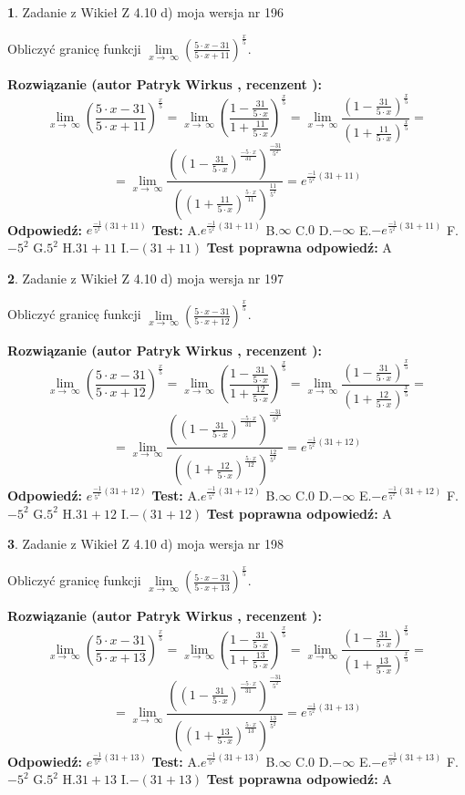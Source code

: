 \documentclass[12pt, a4paper]{article}
\theoremstyle{definition} %
\newtheorem{zad}{}
\newcommand{\zadStart}[1]{\begin{zad}#1\newline}
\newcommand{\zadStop}{\end{zad}}
\newcommand{\rozwStart}[2]{\noindent \textbf{Rozwiązanie (autor #1 , recenzent #2): }\newline}
\newcommand{\rozwStop}{\newline}
\newcommand{\odpStart}{\noindent \textbf{Odpowiedź:}\newline}
\newcommand{\odpStop}{\newline}
\newcommand{\testStart}{\noindent \textbf{Test:}\newline}
\newcommand{\testStop}{\newline}
\newcommand{\kluczStart}{\noindent \textbf{Test poprawna odpowiedź:}\newline}
\newcommand{\kluczStop}{\newline}
\begin{document}
\zadStart{Zadanie z Wikieł Z 4.10 d) moja wersja nr 196}


Obliczyć granicę funkcji  $\lim\limits_{x\to\ \infty}(\frac{5\cdot x-31}{5\cdot x+11})^{\frac{x}{5}}$.
\zadStop
\rozwStart{Patryk Wirkus}{}
$$\lim\limits_{x\to\ \infty}(\frac{5\cdot x-31}{5\cdot x+11})^{\frac{x}{5}} = \lim\limits_{x\to\ \infty}(\frac{1-\frac{31}{5\cdot x}}{1+\frac{11}{5\cdot x}})^{\frac{x}{5}}=\lim\limits_{x\to\ \infty}\frac{(1-\frac{31}{5\cdot x})^{\frac{x}{5}}}{(1+\frac{11}{5\cdot x})^{\frac{x}{5}}}=$$
$$=\lim\limits_{x\to\ \infty}\frac{((1-\frac{31}{5\cdot x})^{\frac{-5\cdot x}{31}})^{\frac{-31}{5^{2}}}}{((1+\frac{11}{5\cdot x})^{\frac{5\cdot x}{11}})^{\frac{11}{5^{2}}}}=e^{\frac{-1}{5^{2}}(31+11)}$$
\rozwStop
\odpStart
$e^{\frac{-1}{5^{2}}(31+11)}$
\odpStop
\testStart
A.$e^{\frac{-1}{5^{2}}(31+11)}$ B.$\infty$ C.$0$ D.$-\infty$ E.$-e^{\frac{-1}{5^{2}}(31+11)}$
F.$-5^{2}$ G.$5^{2}$
H.$31+11$
I.$-(31+11)$
\testStop
\kluczStart
A
\kluczStop



\zadStart{Zadanie z Wikieł Z 4.10 d) moja wersja nr 197}


Obliczyć granicę funkcji  $\lim\limits_{x\to\ \infty}(\frac{5\cdot x-31}{5\cdot x+12})^{\frac{x}{5}}$.
\zadStop
\rozwStart{Patryk Wirkus}{}
$$\lim\limits_{x\to\ \infty}(\frac{5\cdot x-31}{5\cdot x+12})^{\frac{x}{5}} = \lim\limits_{x\to\ \infty}(\frac{1-\frac{31}{5\cdot x}}{1+\frac{12}{5\cdot x}})^{\frac{x}{5}}=\lim\limits_{x\to\ \infty}\frac{(1-\frac{31}{5\cdot x})^{\frac{x}{5}}}{(1+\frac{12}{5\cdot x})^{\frac{x}{5}}}=$$
$$=\lim\limits_{x\to\ \infty}\frac{((1-\frac{31}{5\cdot x})^{\frac{-5\cdot x}{31}})^{\frac{-31}{5^{2}}}}{((1+\frac{12}{5\cdot x})^{\frac{5\cdot x}{12}})^{\frac{12}{5^{2}}}}=e^{\frac{-1}{5^{2}}(31+12)}$$
\rozwStop
\odpStart
$e^{\frac{-1}{5^{2}}(31+12)}$
\odpStop
\testStart
A.$e^{\frac{-1}{5^{2}}(31+12)}$ B.$\infty$ C.$0$ D.$-\infty$ E.$-e^{\frac{-1}{5^{2}}(31+12)}$
F.$-5^{2}$ G.$5^{2}$
H.$31+12$
I.$-(31+12)$
\testStop
\kluczStart
A
\kluczStop



\zadStart{Zadanie z Wikieł Z 4.10 d) moja wersja nr 198}


Obliczyć granicę funkcji  $\lim\limits_{x\to\ \infty}(\frac{5\cdot x-31}{5\cdot x+13})^{\frac{x}{5}}$.
\zadStop
\rozwStart{Patryk Wirkus}{}
$$\lim\limits_{x\to\ \infty}(\frac{5\cdot x-31}{5\cdot x+13})^{\frac{x}{5}} = \lim\limits_{x\to\ \infty}(\frac{1-\frac{31}{5\cdot x}}{1+\frac{13}{5\cdot x}})^{\frac{x}{5}}=\lim\limits_{x\to\ \infty}\frac{(1-\frac{31}{5\cdot x})^{\frac{x}{5}}}{(1+\frac{13}{5\cdot x})^{\frac{x}{5}}}=$$
$$=\lim\limits_{x\to\ \infty}\frac{((1-\frac{31}{5\cdot x})^{\frac{-5\cdot x}{31}})^{\frac{-31}{5^{2}}}}{((1+\frac{13}{5\cdot x})^{\frac{5\cdot x}{13}})^{\frac{13}{5^{2}}}}=e^{\frac{-1}{5^{2}}(31+13)}$$
\rozwStop
\odpStart
$e^{\frac{-1}{5^{2}}(31+13)}$
\odpStop
\testStart
A.$e^{\frac{-1}{5^{2}}(31+13)}$ B.$\infty$ C.$0$ D.$-\infty$ E.$-e^{\frac{-1}{5^{2}}(31+13)}$
F.$-5^{2}$ G.$5^{2}$
H.$31+13$
I.$-(31+13)$
\testStop
\kluczStart
A
\kluczStop
\end{document}

